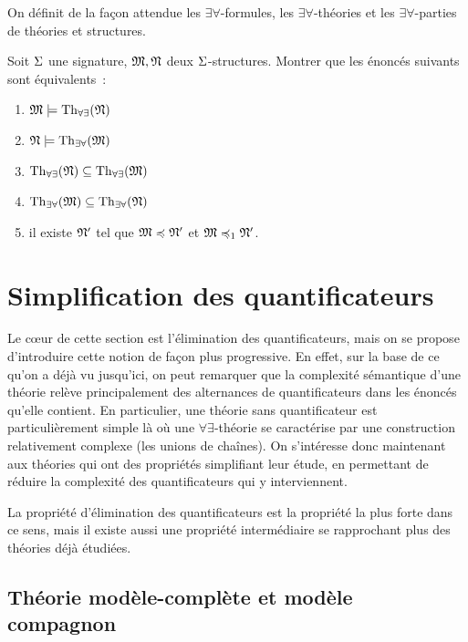 \begin{exercise}
  On définit de la façon attendue les $\exists\forall$-formules, les
  $\exists\forall$-théories et les $\exists\forall$-parties de théories et
  structures.

  Soit $\Sigma$ une signature, $\mathfrak{M},\mathfrak{N}$ deux $\Sigma$-structures.
  Montrer que les énoncés suivants sont équivalents~:
  \begin{enumerate}[label=(\roman*)]
  \item $\mathfrak{M}\models\operatorname{Th}_{\forall\exists}(\mathfrak{N})$
  \item $\mathfrak{N}\models\operatorname{Th}_{\exists\forall}(\mathfrak{M})$
  \item $\operatorname{Th}_{\forall\exists}(\mathfrak{N})\subseteq\operatorname{Th}_{\forall\exists}(\mathfrak{M})$
  \item $\operatorname{Th}_{\exists\forall}(\mathfrak{M})\subseteq\operatorname{Th}_{\exists\forall}(\mathfrak{N})$
  \item il existe $\mathfrak{N}'$ tel que $\mathfrak{M}\preccurlyeq\mathfrak{N}'$ et
    $\mathfrak{M}\preccurlyeq_{1}\mathfrak{N}'$.
  \end{enumerate}
\end{exercise}

\section{Simplification des quantificateurs}

Le c\oe ur de cette section est l'élimination des quantificateurs, mais on se
propose d'introduire cette notion de façon plus progressive. En effet, sur la
base de ce qu'on a déjà vu jusqu'ici, on peut remarquer que la complexité
sémantique d'une théorie relève principalement des alternances de
quantificateurs dans les énoncés qu'elle contient. En particulier, une théorie
sans quantificateur est particulièrement simple là où une
$\forall\exists$-théorie se caractérise par une construction relativement
complexe (les unions de chaînes). On s'intéresse donc maintenant aux théories
qui ont des propriétés simplifiant leur étude, en permettant de réduire la
complexité des quantificateurs qui y interviennent.

La propriété d'élimination des quantificateurs est la propriété la plus forte
dans ce sens, mais il existe aussi une propriété intermédiaire se rapprochant
plus des théories déjà étudiées.

\subsection{Théorie modèle-complète et modèle compagnon}

